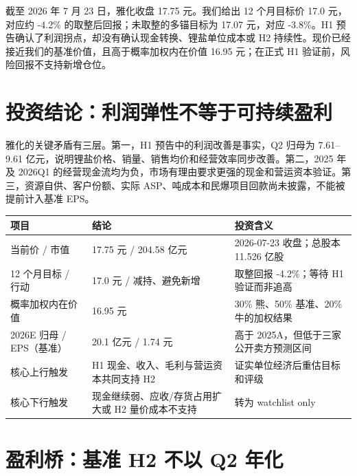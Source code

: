 \begin{houseviewbox}
截至 2026 年 7 月 23 日，雅化收盘 17.75 元。我们给出 12 个月目标价 17.0 元，对应约 -4.2\% 的取整后回报；未取整的多锚目标为 17.07 元，对应 -3.8\%。H1 预告确认了利润拐点，却没有确认现金转换、锂盐单位成本或 H2 持续性。现价已经接近我们的基准价值，且高于概率加权内在价值 16.95 元；在正式 H1 验证前，风险回报不支持新增仓位。
\end{houseviewbox}

\section{投资结论：利润弹性不等于可持续盈利}

雅化的关键矛盾有三层。第一，H1 预告中的利润改善是事实，Q2 归母为 7.61--9.61 亿元，说明锂盐价格、销量、销售均价和经营效率同步改善。第二，2025 年及 2026Q1 的经营现金流均为负，市场有理由要求更强的现金和营运资本验证。第三，资源自供、客户份额、实际 ASP、吨成本和民爆项目回款尚未披露，不能被提前计入基准 EPS。

\begin{exhibitbox}[表 1-1：IC 决策卡]
\begin{tabularx}{\exhibitboxwidth}{L{3.3cm}R{3.0cm}X}
\toprule
项目 & 结论 & 投资含义 \\
\midrule
当前价 / 市值 & 17.75 元 / 204.58 亿元 & 2026-07-23 收盘；总股本 11.526 亿股 \\
12 个月目标 / 行动 & 17.0 元 / 减持、避免新增 & 取整回报 -4.2\%；等待 H1 验证而非追高 \\
概率加权内在价值 & 16.95 元 & 30\% 熊、50\% 基准、20\% 牛的加权结果 \\
2026E 归母 / EPS（基准） & 20.1 亿元 / 1.74 元 & 高于 2025A，但低于三家公开卖方预测区间 \\
核心上行触发 & H1 现金、收入、毛利与营运资本共同支持 H2 & 证实单位经济后重估目标和评级 \\
核心下行触发 & 现金继续弱、应收/存货占用扩大或 H2 量价成本不支持 & 转为 watchlist only \\
\bottomrule
\end{tabularx}
\end{exhibitbox}

\section{盈利桥：基准 H2 不以 Q2 年化}

